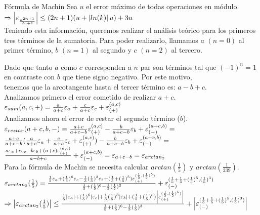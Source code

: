 \begin{subsection}{Fórmula de Machin}
	Sea $u$ el error máximo de todas operaciones en módulo.\\
	
	$\Rightarrow \left|\varepsilon _{\frac{k^{2n+1}}{2n+1}}\right| \leq (2n+1)(u + \left|ln(k)\right|u) + 3u$\\
	
	Teniendo esta información, queremos realizar el análisis teórico para los primeros tres términos de la sumatoria. Para poder realizarlo, llamamos $a$ $(n=0)$ al primer término,
	$b$ $(n=1)$ al segundo y $c$ $(n=2)$ al tercero.
	
	Dado que tanto $a$ como $c$ corresponden a $n$ par son términos tal que $(-1)^n = 1$ en contraste con $b$ que tiene signo negativo. Por este motivo,\\
	tenemos que la arcotangente hasta el tercer término es: $a - b + c$.\\
	
	Analizamos primero el error cometido de realizar $a+c$.\\
	
	$\varepsilon _{sum}({a,c,+}) = \frac{a}{a+c}\varepsilon _{a} + \frac{c}{a+c}\varepsilon _{c} + \varepsilon _{({+})}^{({a,c})}$\\
	
	Analizamos ahora el error de restar el segundo término ($b$).\\
		
	$\varepsilon _{restar}({a+c,b,-}) = \frac{a+c}{a+c-b}\varepsilon _{({+})}^{({a,c})} - \frac{b}{a+c-b}\varepsilon _{b} + \varepsilon _{({-})}^{({a+c,b})} =$\\
	
	$\frac{a+c}{a+c-b}(\frac{a}{a+c}\varepsilon _{a} + \frac{c}{a+c}\varepsilon _{c} + \varepsilon _{({+})}^{({a,c})}) - \frac{b}{a+c-b}\varepsilon _{b} + \varepsilon _{({-})}^{({a+c,b})} =$\\
	
	$\frac{a\varepsilon _{a} + c\varepsilon _{c} - b\varepsilon _{b} + (a+c)\varepsilon _{({+})}^{({a,c})}}{a-b+c} + \varepsilon _{({-})}^{({a+c,b})} = \varepsilon _{a+c-b} = \varepsilon _{arctan_2}$\\
		
	Para la fórmula de Machin se necesita calcular $arctan(\frac{1}{5})$ y $arctan(\frac{1}{239})$.\\
	
	$\varepsilon _{arctan_2}({\frac{1}{5}}) = \frac{\frac{1}{5}\varepsilon _{a} + (\frac{1}{5})^6\varepsilon _{c} - \frac{1}{3}(\frac{1}{5})^3\varepsilon _{b} + (\frac{1}{5} + (\frac{1}{5})^5)\varepsilon _{({+})}^{({\frac{1}{5},(\frac{1}{5})^5})}}{\frac{1}{5} + (\frac{1}{5})^6 - \frac{1}{3}(\frac{1}{5})^3} + \varepsilon _{({-})}^{({\frac{1}{5} + \frac{1}{5} + (\frac{1}{5})^5,(\frac{1}{5})^3})}$\\
	
	$\Rightarrow \left| \varepsilon _{arctan_2}({\frac{1}{5}}) \right| \leq \frac{\frac{1}{5}\left| \varepsilon _{a} \right| + (\frac{1}{5})^6\left| \varepsilon _{c} \right| + \frac{1}{3}(\frac{1}{5})^3\left| \varepsilon _{b} \right| + (\frac{1}{5} + (\frac{1}{5})^5)\left| \varepsilon _{({+})}^{({\frac{1}{5},(\frac{1}{5})^5})} \right|}{\frac{1}{5} + (\frac{1}{5})^6 - \frac{1}{3}(\frac{1}{5})^3} + \left|\varepsilon _{({-})}^{({\frac{1}{5} + \frac{1}{5} + (\frac{1}{5})^5,(\frac{1}{5})^3})} \right|$\\
	

\end{subsection}
